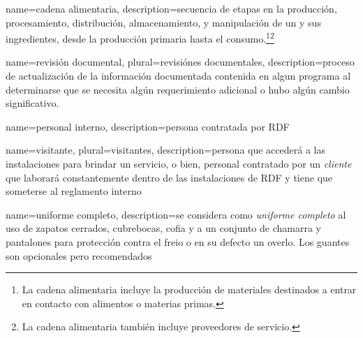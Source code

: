 


{
    name=cadena alimentaria,
    description={secuencia de etapas en la producción, procesamiento, distribución, almacenamiento, y manipulación de un  y sus ingredientes, desde la producción primaria hasta el consumo.\footnote{La cadena alimentaria incluye la producción de materiales destinados a entrar en contacto con alimentos o materias primas.}\footnote{La cadena alimentaria también incluye proveedores de servicio.}}
}



{
    name=revisión documental,
    plural=revisiónes documentales,
    description={proceso de actualización de la información documentada contenida en algun programa al determinarse que se necesita algún requerimiento adicional o hubo algún cambio significativo.}
}

{
    name=personal interno,
    description={persona contratada por RDF}
}

{
    name=visitante,
    plural=visitantes,
    description={persona que accederá a las instalaciones para brindar un servicio, o bien, personal contratado por un \emph{cliente} que laborará constantemente dentro de las instalaciones de RDF y tiene que someterse al reglamento interno}
}

{
    name=uniforme completo,
    description={se considera como \textit{uniforme completo} al uso de zapatos cerrados, cubrebocas, cofia y a un conjunto de chamarra y pantalones para protección contra el freio o en su defecto un overlo. Los guantes son opcionales pero recomendados}
}

